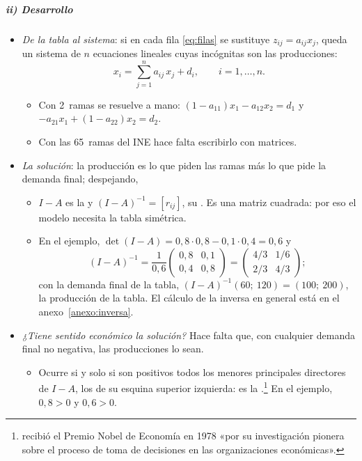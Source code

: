 \documentclass[11pt]{article}
\begin{document}
\subparagraph{ii) Desarrollo}

\begin{itemize}
\item \emph{De la tabla al sistema}: si en cada fila \eqref{eq:filas} se sustituye $z_{ij}=a_{ij}x_j$, queda un sistema de $n$ ecuaciones lineales cuyas incógnitas son las producciones:
\[
x_i=\sum_{j=1}^{n}a_{ij}\,x_j+d_i,\qquad i=1,\dots,n.
\]
  \begin{itemize}
  \item Con 2~ramas se resuelve a mano: $(1-a_{11})x_1-a_{12}x_2=d_1$ y $-a_{21}x_1+(1-a_{22})x_2=d_2$.
  \item Con las 65~ramas del INE hace falta escribirlo con matrices.
  \end{itemize}
\item \emph{La solución}: la producción es lo que piden las ramas más lo que pide la demanda final; despejando,
  \begin{itemize}
  \item $I-A$ es la  y $(I-A)^{-1}=[r_{ij}]$, su . Es una matriz cuadrada: por eso el modelo necesita la tabla simétrica.
  \item En el ejemplo, $\det(I-A)=0{,}8\cdot0{,}8-0{,}1\cdot0{,}4=0{,}6$ y
\[
(I-A)^{-1}=\frac{1}{0{,}6}\begin{pmatrix}0{,}8 & 0{,}1\\ 0{,}4 & 0{,}8\end{pmatrix}=\begin{pmatrix}4/3 & 1/6\\ 2/3 & 4/3\end{pmatrix};
\]
    con la demanda final de la tabla, $(I-A)^{-1}(60;\ 120)=(100;\ 200)$, la producción de la tabla. El cálculo de la inversa en general está en el anexo~\ref{anexo:inversa}.
  \end{itemize}
\item \emph{¿Tiene sentido económico la solución?} Hace falta que, con cualquier demanda final no negativa, las producciones lo sean.
  \begin{itemize}
  \item Ocurre si y solo si son positivos todos los menores principales directores de $I-A$, los de su esquina superior izquierda: es la \nocite{HawkinsSimon1949}.\footnote{ recibió el Premio Nobel de Economía en 1978 «por su investigación pionera sobre el proceso de toma de decisiones en las organizaciones económicas»\nocite{Nobel1978Simon}.} En el ejemplo, $0{,}8>0$ y $0{,}6>0$.

\end{itemize}
\end{itemize}
\end{document}
